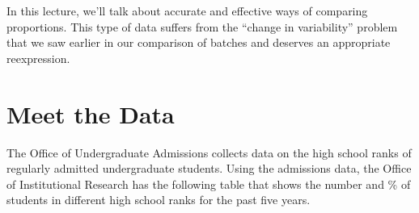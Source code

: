 \documentclass[
]{book}
\begin{document}
In this lecture, we'll talk about accurate and effective ways of comparing proportions. This type of data suffers from the ``change in variability'' problem that we saw earlier in our comparison of batches and deserves an appropriate reexpression.

\hypertarget{meet-the-data-10}{%
\section{Meet the Data}\label{meet-the-data-10}}

The Office of Undergraduate Admissions collects data on the high school ranks of regularly admitted undergraduate students. Using the admissions data, the Office of Institutional Research has the following table that shows the number and \% of students in different high school ranks for the past five years.
\end{document}
